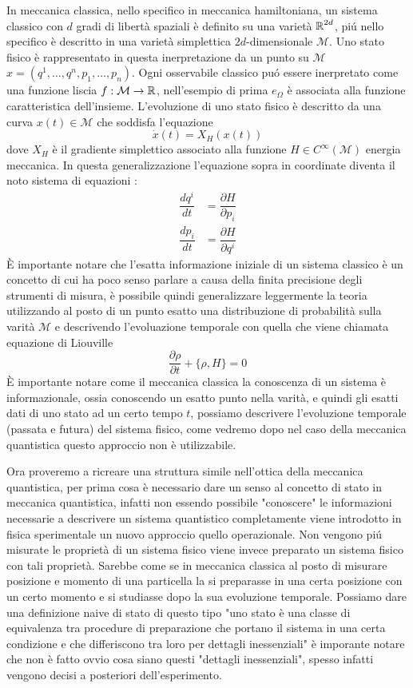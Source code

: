 In meccanica classica, nello specifico in meccanica hamiltoniana, un sistema classico con $d$ gradi di libertà spaziali è definito su una varietà $\operatorname{\mathbb{R}}^{2d}$, piú nello specifico è descritto in una varietà simplettica $2d$-dimensionale $\mathcal{M}$. Uno stato fisico è rappresentato in questa inerpretazione da un punto su $\mathcal{M}$  $x= (q^1, \dots, q^n, p_1, \dots, p_n) $. Ogni osservabile classico puó essere inerpretato come una funzione liscia $f : \mathcal{M} \to \operatorname{\mathbb{R}}$, nell'esempio di prima $e_\Omega$ è associata alla funzione caratteristica dell'insieme. L'evoluzione di uno stato fisico è descritto da una curva $x(t) \in \mathcal{M}$ che soddisfa l'equazione $$\dot{x}(t)= X_H(x(t))$$ dove $X_H$ è il gradiente simplettico associato alla funzione $H \in C^\infty (\mathcal{M})$ energia meccanica. In questa generalizzazione l'equazione sopra in coordinate diventa il noto sistema di equazioni :
\begin{align*}
    \dfrac{dq^i}{dt} &= \dfrac{\partial H}{\partial p_i} \\ 
    \dfrac{dp_i}{dt} &= \dfrac{\partial H}{\partial q^i}
\end{align*}
È importante notare che l'esatta informazione iniziale di un sistema classico è un concetto di cui ha poco senso parlare a causa della finita precisione degli strumenti di misura, è possibile quindi generalizzare leggermente la teoria utilizzando al posto di un punto esatto una distribuzione di probabilità sulla varità $\mathcal{M}$ e descrivendo l'evoluazione temporale con quella che viene chiamata equazione di Liouville $$\dfrac{\partial \rho}{\partial t} + \{ \rho, H\} = 0$$ È importante notare come il meccanica classica la conoscenza di un sistema è informazionale, ossia conoscendo un esatto punto nella varità, e quindi gli esatti dati di uno stato ad un certo tempo $t$, possiamo descrivere l'evoluzione temporale (passata e futura) del sistema fisico, come vedremo dopo nel caso della meccanica quantistica questo approccio non è utilizzabile. 

Ora proveremo a ricreare una struttura simile nell'ottica della meccanica quantistica, per prima cosa è necessario dare un senso al concetto di stato in meccanica quantistica, infatti non essendo possibile "conoscere" le informazioni necessarie a descrivere un sistema quantistico completamente viene introdotto in fisica sperimentale un nuovo approccio quello operazionale. Non vengono piú misurate le proprietà di un sistema fisico viene invece preparato un sistema fisico con tali proprietà. Sarebbe come se in meccanica classica al posto di misurare posizione e momento di una particella la si preparasse in una certa posizione con un certo momento e si studiasse dopo la sua evoluzione temporale. Possiamo dare una definizione naive di stato di questo tipo "uno stato è una classe di equivalenza tra procedure di preparazione che portano il sistema in una certa condizione e che differiscono tra loro per dettagli inessenziali" è imporante notare che non è fatto ovvio cosa siano questi "dettagli inessenziali", spesso infatti vengono decisi a posteriori dell'esperimento. 

